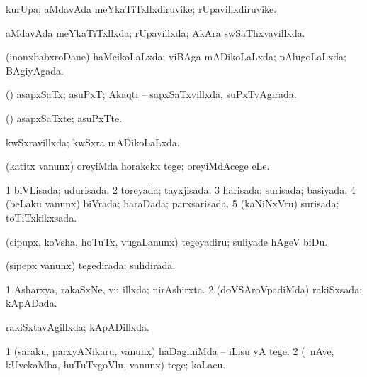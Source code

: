 {{\bentry
{} 
\gl{\nA}
\expl{}
\bmng
kurUpa; aMdavAda meYkaTiTxllxdiruvike; rUpavillxdiruvike. 
\emng
\eentry

\bentry
{} 
\gl{\gu}
\expl{}
\bmng
aMdavAda meYkaTiTxllxda; rUpavillxda; AkAra swSaThxvavillxda. 
\emng
\eentry

\bentry
{} 
\gl{\gu}
\expl{}
\bmng
(inonxbabxroDane) haMcikoLaLxda; viBAga mADikoLaLxda; pAlugoLaLxda; BAgiyAgada. 
\emng
\eentry

\bentry
{} 
\gl{\gu}
\expl{}
\bmng
(\CA) asapxSaTx; asuPxT; Akaqti -- sapxSaTxvillxda, suPxTvAgirada. 
\emng
\eentry

\bentry
{} 
\gl{\nA}
\expl{}
\bmng
(\CA) asapxSaTxte; asuPxTte. 
\emng
\eentry

\bentry
{} 
\gl{\gu}
\expl{}
\bmng
kwSxravillxda; kwSxra mADikoLaLxda. 
\emng
\eentry

\bentry
{} 
\gl{\gu}
\expl{}
\bmng
{} 
\emng
\eentry

\bentry
{} 
\gl{\sakirx}
\expl{}
\bmng
(katitx \mo vanunx) oreyiMda horakekx tege; oreyiMdAcege eLe. 
\emng
\eentry

\bentry
{} 
\gl{\gu}
\expl{}
\bmng
\bnum
\num{1} biVLisada; udurisada. 
\num{2} toreyada; tayxjisada. 
\num{3} harisada; surisada; basiyada. 
\num{4} (beLaku \mo vanunx) biVrada; haraDada; parxsarisada. 
\num{5} (kaNiNxVru) surisada; toTiTxkikxsada. 
\enum
\emng
\eentry

\bentry
{} 
\gl{\sakirx}
\expl{}
\bmng
(cipupx, koVsha, hoTuTx, \mo vugaLanunx) tegeyadiru; suliyade hAgeV biDu. 
\emng
\eentry

\bentry
{} 
\gl{\gu}
\expl{}
\bmng
(sipepx \mo vanunx) tegedirada; sulidirada. 
\emng
\eentry

\bentry
{} 
\gl{\gu}
\expl{}
\bmng
\bnum
\num{1} Asharxya, rakaSxNe, \mo vu illxda; nirAshirxta. 
\num{2} (doVSAroVpadiMda) rakiSxsada; kApADada. 
\enum
\emng
\eentry

\bentry
{} 
\gl{\gu}
\expl{}
\bmng
rakiSxtavAgillxda; kApADillxda. 
\emng
\eentry

\bentry
{} 
\gl{\akirx}
\bmng
\bnum
\num{1} (saraku, parxyANikaru, \mo vanunx) haDaginiMda -- iLisu yA tege. 
\num{2} (\kanmu\ nAve, kUvekaMba, huTuTxgoVlu, \mo vanunx) tege; kaLacu. 
\enum
\emng
\eentry

}}
